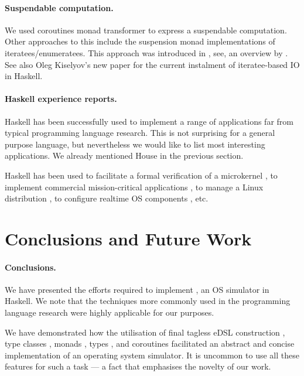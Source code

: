 \paragraph{Suspendable computation.} We used coroutines monad transformer \cite{cmt} to express a suspendable computation. 
Other approaches to this include the suspension monad implementations of iteratees/enumeratees. This approach was introduced in \cite{oleg-iteratee}, see, \eg an overview by \citeauthor{lato2010iteratee} \cite{lato2010iteratee}.
See also Oleg Kiselyov's new paper \cite{springerlink:10.1007/978-3-642-29822-6_15} for the current instalment of iteratee-based IO in Haskell.

\paragraph{Haskell experience reports.}  
Haskell has been successfully used to implement a range of applications far from typical programming language research.
This is not surprising for a general purpose language, but nevertheless we would like to list most interesting applications. 
We already mentioned House \cite{house} in the previous section.

Haskell has been used to facilitate a formal verification of a
microkernel \cite{Klein:2009:ERS:1631687.1596566}, to implement
commercial mission-critical applications
\cite{Sampson:2009:ERH:1631687.1596578}, to manage a Linux
distribution \cite{Beshers:2007:ERU:1291220.1291184}, to configure
realtime OS components \cite{Jones:2008:ERP:1411203.1411219}, etc.

\section{Conclusions and Future Work}
\label{sec:concl-future-work}

\paragraph{Conclusions.}
We have presented the efforts required to implement \soosim, an OS simulator in Haskell.
We note that the techniques more commonly used in the programming language research were highly applicable for our purposes.

We have demonstrated how the utilisation of final tagless eDSL construction \cite{final_tagless_embedding,Hofer:2008:PED:1449913.1449935}, type classes \cite{Hall:1996:TCH:227699.227700}, monads \cite{Wadler:1990:CM:91556.91592},  types \cite{Abadi:1991:DTS:103135.103138}, and coroutines \cite{coroutines,cmt} facilitated an abstract and concise implementation of an operating system simulator.
It is uncommon to use all these features for such a task --- a fact that emphasises the novelty of our work.

